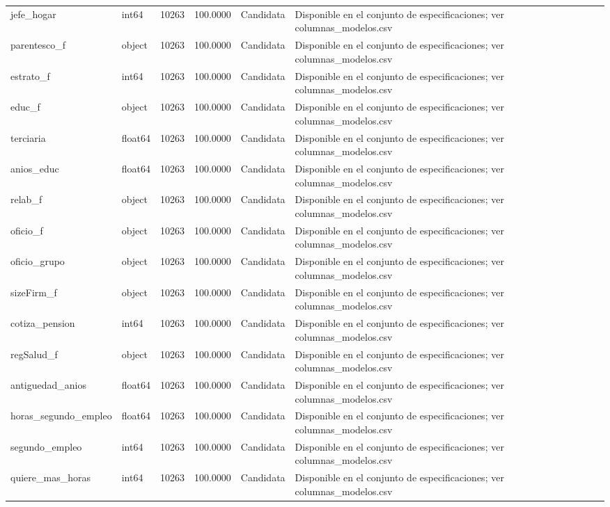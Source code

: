\begin{longtable}{llrrll}
jefe\_hogar & int64 & 10263 & 100.0000 & Candidata & Disponible en el conjunto de especificaciones; ver columnas\_modelos.csv \\
parentesco\_f & object & 10263 & 100.0000 & Candidata & Disponible en el conjunto de especificaciones; ver columnas\_modelos.csv \\
estrato\_f & int64 & 10263 & 100.0000 & Candidata & Disponible en el conjunto de especificaciones; ver columnas\_modelos.csv \\
educ\_f & object & 10263 & 100.0000 & Candidata & Disponible en el conjunto de especificaciones; ver columnas\_modelos.csv \\
terciaria & float64 & 10263 & 100.0000 & Candidata & Disponible en el conjunto de especificaciones; ver columnas\_modelos.csv \\
anios\_educ & float64 & 10263 & 100.0000 & Candidata & Disponible en el conjunto de especificaciones; ver columnas\_modelos.csv \\
relab\_f & object & 10263 & 100.0000 & Candidata & Disponible en el conjunto de especificaciones; ver columnas\_modelos.csv \\
oficio\_f & object & 10263 & 100.0000 & Candidata & Disponible en el conjunto de especificaciones; ver columnas\_modelos.csv \\
oficio\_grupo & object & 10263 & 100.0000 & Candidata & Disponible en el conjunto de especificaciones; ver columnas\_modelos.csv \\
sizeFirm\_f & object & 10263 & 100.0000 & Candidata & Disponible en el conjunto de especificaciones; ver columnas\_modelos.csv \\
cotiza\_pension & int64 & 10263 & 100.0000 & Candidata & Disponible en el conjunto de especificaciones; ver columnas\_modelos.csv \\
regSalud\_f & object & 10263 & 100.0000 & Candidata & Disponible en el conjunto de especificaciones; ver columnas\_modelos.csv \\
antiguedad\_anios & float64 & 10263 & 100.0000 & Candidata & Disponible en el conjunto de especificaciones; ver columnas\_modelos.csv \\
horas\_segundo\_empleo & float64 & 10263 & 100.0000 & Candidata & Disponible en el conjunto de especificaciones; ver columnas\_modelos.csv \\
segundo\_empleo & int64 & 10263 & 100.0000 & Candidata & Disponible en el conjunto de especificaciones; ver columnas\_modelos.csv \\
quiere\_mas\_horas & int64 & 10263 & 100.0000 & Candidata & Disponible en el conjunto de especificaciones; ver columnas\_modelos.csv \\

\end{longtable}

